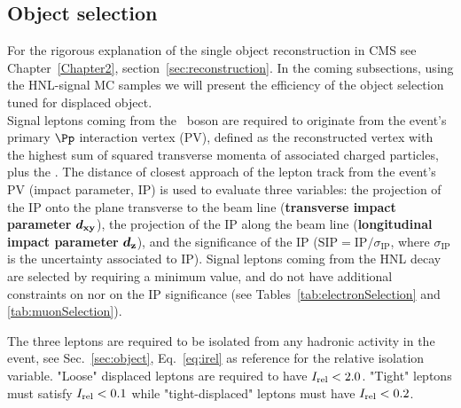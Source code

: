 \subsection{Object selection}\label{sec:llobject}
For the rigorous explanation of the single object reconstruction in
CMS see Chapter~\ref{Chapter2}, section~\ref{sec:reconstruction}.
In the coming subsections, using the HNL-signal MC samples we will
present the efficiency of the object selection tuned for displaced
object. \\

Signal leptons coming from the \PW\ boson are required to originate
from the event's primary $\Pp$ interaction vertex (PV), defined as
the reconstructed vertex with the highest sum of squared transverse
momenta of associated charged particles, plus the \ptmiss.
The distance of closest approach of the lepton track from the event's
PV (impact parameter, IP) is used to evaluate three variables:
the projection of the IP onto the plane transverse to the beam line
(\textbf{transverse impact parameter} $\boldsymbol{d_{\mathrm{xy}}}$),
the projection of the IP along the beam line (\textbf{longitudinal impact
parameter} $\boldsymbol{d_{\mathrm{z}}}$),
and the significance of the IP
($\mathrm{SIP} = \mathrm{IP}/\sigma_{\mathrm{IP}}$,
where $\sigma_{\mathrm{IP}}$ is the uncertainty associated to IP). Signal leptons coming from the HNL decay are selected by requiring a
minimum \dxy value, and do not have additional constraints on \dz nor
on the IP significance (see Tables~\ref{tab:electronSelection} and
\ref{tab:muonSelection}).

The three leptons are required to be isolated from any hadronic activity
in the event, see Sec.~\ref{sec:object}, Eq.~\ref{eq:irel} as reference for the relative isolation variable. 
"Loose" displaced leptons are required to have $I_{\mathrm{rel}} < 2.0$. 
"Tight" leptons must satisfy $I_{\mathrm{rel}} < 0.1$ while "tight-displaced" leptons must have $I_{\mathrm{rel}} < 0.2$.

